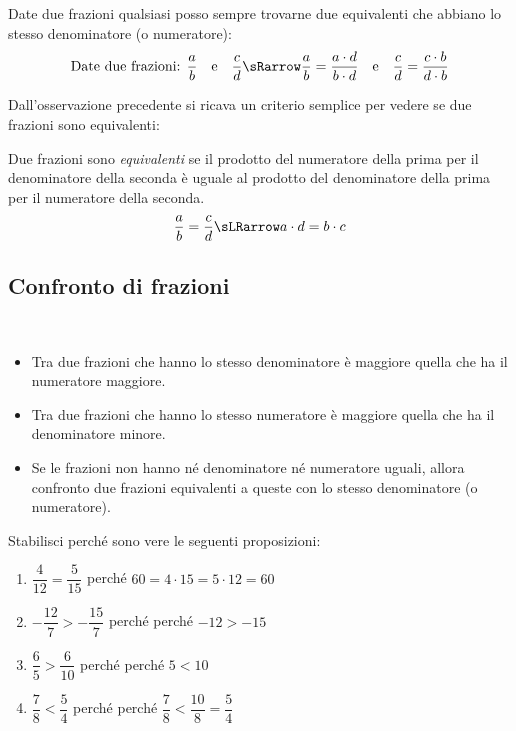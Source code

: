\begin{osservazione}
 Date due frazioni qualsiasi posso sempre trovarne due equivalenti che 
abbiano lo stesso denominatore (o numeratore):
\[\text{Date due frazioni: } \frac{a}{b} \quad \text{e} \quad \frac{c}{d} 
\sRarrow
\frac{a}{b} = \frac{a \cdot d}{b \cdot d} \quad \text{e} \quad 
\frac{c}{d} = \frac{c \cdot b}{d \cdot b}\]
\end{osservazione}

Dall'osservazione precedente si ricava un criterio semplice 
per vedere se due frazioni sono equivalenti:

\begin{definizione}
 Due frazioni sono \emph{equivalenti} se il prodotto del numeratore della 
prima per il denominatore della seconda è uguale al prodotto del 
denominatore della prima per il numeratore della seconda.
\[\frac{a}{b} = \frac{c}{d} \sLRarrow a \cdot d = b \cdot c\]
\end{definizione}

\subsection{Confronto di frazioni}
\label{sub:razionali_confronto}

\begin{definizione}
~

\begin{itemize}
 \item Tra due frazioni che hanno lo stesso denominatore è maggiore quella 
che ha il numeratore maggiore.
 \item Tra due frazioni che hanno lo stesso numeratore è maggiore quella 
che ha il denominatore minore.
 \item Se le frazioni non hanno né denominatore né numeratore uguali, 
allora confronto due frazioni equivalenti a queste con lo stesso 
denominatore (o numeratore).
\end{itemize}
\end{definizione}

\begin{esempio}
 Stabilisci perché sono vere le seguenti proposizioni:
 \begin{enumerate} [noitemsep]
  \item \(\dfrac{4}{12} = \dfrac{5}{15}\)
    \qquad perché \quad \(60 = 4 \cdot 15 = 5 \cdot 12 = 60\)
  \item \(-\dfrac{12}{7} > -\dfrac{15}{7}\)
    \qquad perché \quad perché \(-12 > -15\)
  \item \(\dfrac{6}{5} > \dfrac{6}{10}\)
    \qquad perché \quad perché \(5 < 10\)
  \item \(\dfrac{7}{8} < \dfrac{5}{4}\)
    \qquad perché \quad perché \(\dfrac{7}{8} < \dfrac{10}{8} = 
\dfrac{5}{4}\)
 \end{enumerate}
\end{esempio}

